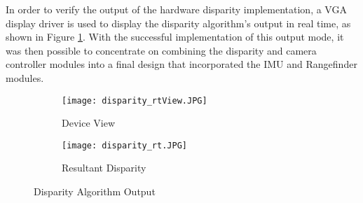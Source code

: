\par
In order to verify the output of the hardware disparity implementation, a VGA display driver is used to display the disparity algorithm's output in real time, as shown in Figure \ref{disparityFin}. With the successful implementation of this output mode, it was then possible to concentrate on combining the disparity and camera controller modules into a final design that incorporated the IMU and Rangefinder modules.
\par
\begin{figure}[H] 
	\begin{subfigure}{0.5\textwidth}
	\centering
		\texttt{[image: disparity\_rtView.JPG]}
		\caption{Device View}
	\end{subfigure}
	\begin{subfigure}{0.5\textwidth}
	\centering
		\texttt{[image: disparity\_rt.JPG]}
		\caption{Resultant Disparity}
	\end{subfigure}
	\caption{Disparity Algorithm Output}
	\label{disparityFin}
\end{figure}